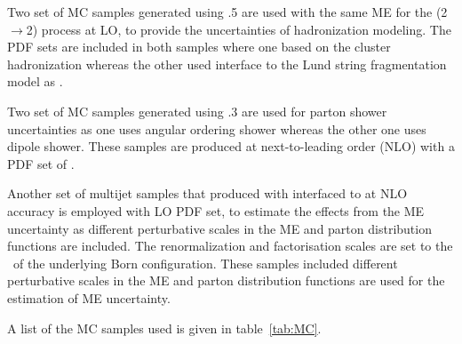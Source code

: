 Two set of MC samples generated using .5 are used with the same ME for the (2$\rightarrow$2) process at LO, to provide the uncertainties of hadronization modeling. The \ctten PDF sets are included in both \sherpa samples where one based on the cluster hadronization whereas the other used \sherpa interface to the Lund string fragmentation model as .

Two set of MC samples generated using .3 are used for parton shower uncertainties as one uses angular ordering shower whereas the other one uses dipole shower. These samples are produced at next-to-leading order (NLO) with a PDF set of \mmht.


Another set of multijet samples that produced with \powheg interfaced to \pythia at NLO accuracy is employed with \nnpdftwo LO PDF set, to estimate the effects from the ME uncertainty as different perturbative scales in the ME and parton distribution functions are included. The renormalization and factorisation scales are set to the \pt~of the underlying Born configuration. These samples included different perturbative scales in the ME and parton distribution functions are used for the estimation of ME uncertainty.




A list of the MC samples used is given in table~\ref{tab:MC}.





